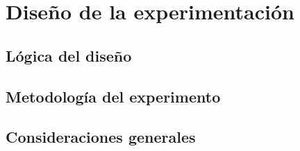 \chapter{Diseño de la experimentación}
\section{Lógica del diseño}

\section{Metodología del experimento}

\section{Consideraciones generales}
